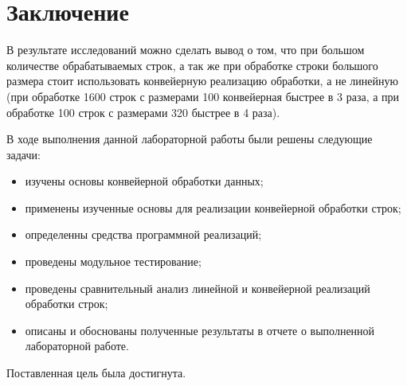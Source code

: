 \chapter*{Заключение}

В результате исследований можно сделать вывод о том, что при большом количестве обрабатываемых строк, а так же при обработке строки большого размера стоит использовать конвейерную реализацию обработки, а не линейную (при обработке  1600 строк с размерами 100 конвейерная быстрее в 3 раза, а при обработке 100 строк с размерами 320 быстрее в 4 раза).

\vspace{5mm}

В ходе выполнения данной лабораторной работы были решены следующие задачи:
\begin{itemize}[label=---]
	\item изучены основы конвейерной обработки данных;
	\item применены изученные основы для реализации конвейерной обработки строк;
	\item определенны средства программной реализаций;
	\item проведены модульное тестирование;
	\item проведены сравнительный анализ линейной и конвейерной реализаций обработки строк; 
	\item описаны и обоснованы полученные результаты в отчете о выполненной лабораторной работе.
\end{itemize}

Поставленная цель была достигнута.